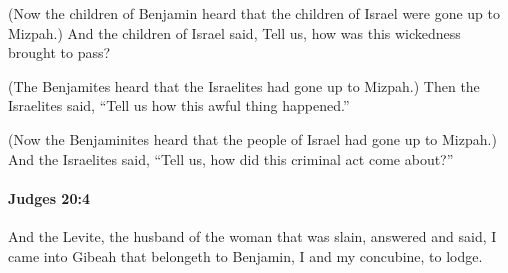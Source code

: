 			\begin{versebox}
					\item[BHS] 
					\item[ASV] (Now the children of Benjamin heard that the children of Israel were gone up to Mizpah.) And the children of Israel said, Tell us, how was this wickedness brought to pass?
					\item[NIV] (The Benjamites heard that the Israelites had gone up to Mizpah.) Then the Israelites said, “Tell us how this awful thing happened.”
					\item[NRSV] (Now the Benjaminites heard that the people of Israel had gone up to Mizpah.) And the Israelites said, “Tell us, how did this criminal act come about?”
			\end{versebox}

		\paragraph{Judges 20:4} %
			\label{JUDGES-20-4}

			And the Levite, the husband of the woman that was slain, answered and said, I came into Gibeah that belongeth to Benjamin, I and my concubine, to lodge.

